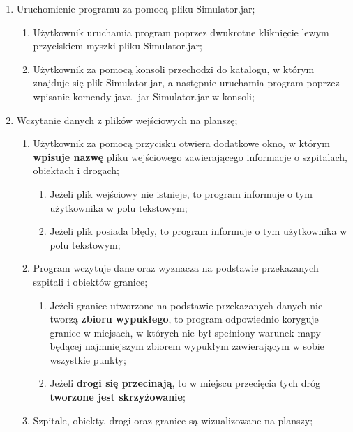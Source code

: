\documentclass{article}
\begin{document}
    \begin{enumerate}[label*=\arabic*.]
      \item Uruchomienie programu za pomocą pliku Simulator.jar;
        \begin{enumerate}[label*=\arabic*.]
            \item Użytkownik uruchamia program poprzez dwukrotne kliknięcie lewym przyciskiem myszki pliku Simulator.jar;
            \item Użytkownik za pomocą konsoli przechodzi do katalogu, w którym znajduje się plik Simulator.jar, a następnie uruchamia program poprzez wpisanie komendy java -jar Simulator.jar w konsoli;
        \end{enumerate}
        \item Wczytanie danych z plików wejściowych na planszę;
        \begin{enumerate}[label*=\arabic*.]
            \item Użytkownik za pomocą przycisku otwiera dodatkowe okno, w którym \textbf{wpisuje nazwę} pliku wejściowego zawierającego informacje o szpitalach, obiektach i drogach;
            \begin{enumerate}[label*=\arabic*.]
                \item Jeżeli plik wejściowy nie istnieje, to program informuje o tym użytkownika w polu tekstowym;
                \item Jeżeli plik posiada błędy, to program informuje o tym użytkownika w polu tekstowym;
            \end{enumerate}
            \item Program wczytuje dane oraz wyznacza na podstawie przekazanych szpitali i obiektów granice;
            \begin{enumerate}[label*=\arabic*.]
                \item Jeżeli granice utworzone na podstawie przekazanych danych nie tworzą \textbf{zbioru wypukłego}, to program odpowiednio koryguje granice w miejsach, w których nie był spełniony warunek mapy będącej najmniejszym zbiorem wypukłym zawierającym w sobie wszystkie punkty;
                \item Jeżeli \textbf{drogi się przecinają}, to w miejscu przecięcia tych dróg \textbf{tworzone jest skrzyżowanie};
            \end{enumerate}
            \item Szpitale, obiekty, drogi oraz granice są wizualizowane na planszy;
            \begin{enumerate}[label*=\arabic*.]

\end{enumerate}
\end{enumerate}
\end{enumerate}
\end{document}
